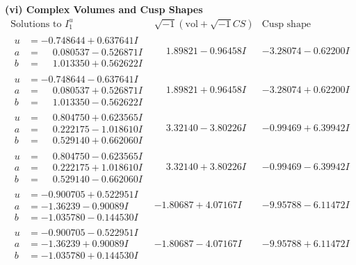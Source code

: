 \documentclass[1p]{elsarticle_modified}
\theoremstyle{definition}
\newcommand{\I}{\sqrt{-1}}
\begin{document}
\newpage\flushleft \textbf{(vi) Complex Volumes and Cusp Shapes}
$$\begin{array}{c|c|c}  
\text{Solutions to }I^u_{1}& \I (\text{vol} + \sqrt{-1}CS) & \text{Cusp shape}\\
 \hline 
\begin{aligned}
u &= -0.748644 + 0.637641 I \\
a &= \phantom{-}0.080537 - 0.526871 I \\
b &= \phantom{-}1.013350 + 0.562622 I\end{aligned}
 & \phantom{-}1.89821 - 0.96458 I & -3.28074 - 0.62200 I \\ \hline\begin{aligned}
u &= -0.748644 - 0.637641 I \\
a &= \phantom{-}0.080537 + 0.526871 I \\
b &= \phantom{-}1.013350 - 0.562622 I\end{aligned}
 & \phantom{-}1.89821 + 0.96458 I & -3.28074 + 0.62200 I \\ \hline\begin{aligned}
u &= \phantom{-}0.804750 + 0.623565 I \\
a &= \phantom{-}0.222175 - 1.018610 I \\
b &= \phantom{-}0.529140 + 0.662060 I\end{aligned}
 & \phantom{-}3.32140 - 3.80226 I & -0.99469 + 6.39942 I \\ \hline\begin{aligned}
u &= \phantom{-}0.804750 - 0.623565 I \\
a &= \phantom{-}0.222175 + 1.018610 I \\
b &= \phantom{-}0.529140 - 0.662060 I\end{aligned}
 & \phantom{-}3.32140 + 3.80226 I & -0.99469 - 6.39942 I \\ \hline\begin{aligned}
u &= -0.900705 + 0.522951 I \\
a &= -1.36239 - 0.90089 I \\
b &= -1.035780 - 0.144530 I\end{aligned}
 & -1.80687 + 4.07167 I & -9.95788 - 6.11472 I \\ \hline\begin{aligned}
u &= -0.900705 - 0.522951 I \\
a &= -1.36239 + 0.90089 I \\
b &= -1.035780 + 0.144530 I\end{aligned}
 & -1.80687 - 4.07167 I & -9.95788 + 6.11472 I \\ \hline\begin{aligned}

\end{aligned}
\end{array}$$
\end{document}
